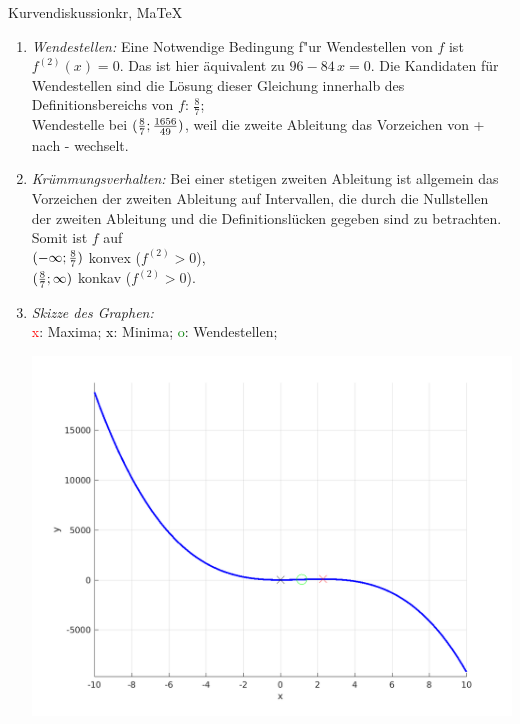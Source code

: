 \begin{MAufgabe}{Kurvendiskussion}{kr, MaTeX}
\begin{enumerate}
 $\MoIl-\infty\MIntvlSep0\MoIr$ monoton fallend, \\ 
 $\MoIl0\MIntvlSep\frac{16}{7}\MoIr$ monoton  wachsend, \\ 
 $\MoIl\frac{16}{7}\MIntvlSep \infty\MoIr$ monoton fallend. \\ 
 \item \emph{Wendestellen:} 
 Eine Notwendige Bedingung f"ur Wendestellen von $f$ ist $f^{(2)}(x)=0$. 
 Das ist hier \"aquivalent zu $96 - 84\, x=0$. 
 Die Kandidaten f\"ur Wendestellen sind die L\"osung dieser Gleichung innerhalb des Definitionsbereichs von $f$: $\frac{8}{7}$; \\ 
 Wendestelle bei $(\frac{8}{7};\frac{1656}{49})$, weil die zweite Ableitung das Vorzeichen von + nach - wechselt. \\ 
 \item \emph{Kr\"ummungsverhalten:} 
 Bei einer stetigen zweiten Ableitung ist allgemein das Vorzeichen der zweiten Ableitung auf Intervallen, die durch die Nullstellen der zweiten Ableitung und die Definitionsl\"ucken gegeben sind zu betrachten. 
 Somit ist $f$ auf \\ 
 $(-\infty ;\frac{8}{7})$  konvex ($f^{(2)}>0$), \\ 
 $(\frac{8}{7}; \infty)$  konkav ($f^{(2)}>0$). \\ 
 \item \emph{Skizze des Graphen:} \\ 
 {\textcolor{red} x}: Maxima; {\textcolor{black} x}: Minima; {\textcolor{green} o}: Wendestellen; 
  \begin{center}
  \includegraphics[width=0.8\linewidth]{Abb_zur_Ag_autogenerated_fractions_40.png} \end{center}
  
 \end{enumerate}
 \else\relax\fi
  \end{MAufgabe}